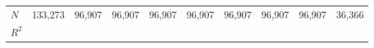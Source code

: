 \begin{tabular}{lrrrrrrrrr}
\midrule
$N$                          &                        133,273 &                      96,907 &                          96,907 &                           96,907 &                      96,907 &                      96,907 &                          96,907 &                           96,907 &                     36,366 \\ 
$R^2$                        &                                &                             &                                 &                                  &                             &                             &                                 &                                  &                            \\ 
\bottomrule
\end{tabular}
